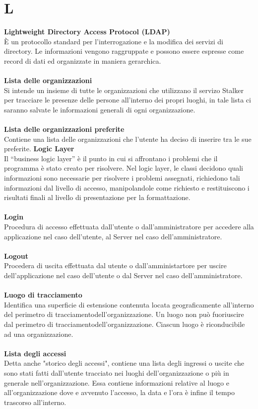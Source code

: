 \section{L}
\textbf{Lightweight Directory Access Protocol (LDAP)}\\
È un protocollo standard per l'interrogazione e la modifica dei servizi di directory. Le informazioni vengono raggruppate e possono essere espresse come record di dati ed organizzate in maniera gerarchica. \\ \\
\textbf{Lista delle organizzazioni}\\
Si intende un insieme di tutte le organizzazioni che utilizzano il servizo Stalker per tracciare le presenze delle persone all’interno dei propri luoghi, in tale lista ci saranno salvate le informazioni generali di ogni organizzazione.\\ \\
\textbf{Lista delle organizzazioni preferite}\\
Contiene una lista delle organizzazioni che l'utente ha deciso di inserire tra le sue preferite.
\textbf{Logic Layer}\\
Il “business logic layer” è il punto in cui si affrontano i problemi che il programma è stato creato per risolvere. Nel logic layer, le classi decidono quali informazioni sono necessarie per risolvere i problemi assegnati, richiedono tali informazioni dal livello di accesso, manipolandole come richiesto e restituiscono i risultati finali al livello di presentazione per la formattazione. \\ \\
\textbf{Login} \\
Procedura di accesso effettuata dall'utente o dall'amministratore per accedere alla applicazione nel caso dell'utente, al Server nel caso dell'amministratore.\\ \\
\textbf{Logout} \\
Procedera di uscita effettuata dal utente o dall'amministartore per uscire dell'applicazione nel caso dell'utente o dal Server nel caso dell'amministratore. \\ \\
\textbf{Luogo di tracciamento}\\
Identifica una superficie di estensione contenuta locata geograficamente all'interno del perimetro di tracciamentodell'organizzazione. Un luogo non può fuoriuscire dal perimetro di tracciamentodell'organizzazione. Ciascun luogo è riconducibile ad una organizzazione.\\ \\
\textbf{Lista degli accessi}\\
Detta anche "storico degli accessi", contiene una lista degli ingressi o uscite che sono stati fatti dall'utente tracciato nei luoghi dell'organizzazione o più in generale nell'organizzazione. Essa contiene informazioni relative al luogo e all'organizzazione dove e avvenuto l'accesso, la data e l'ora è infine il tempo trascorso all'interno.\\ \\
\clearpage